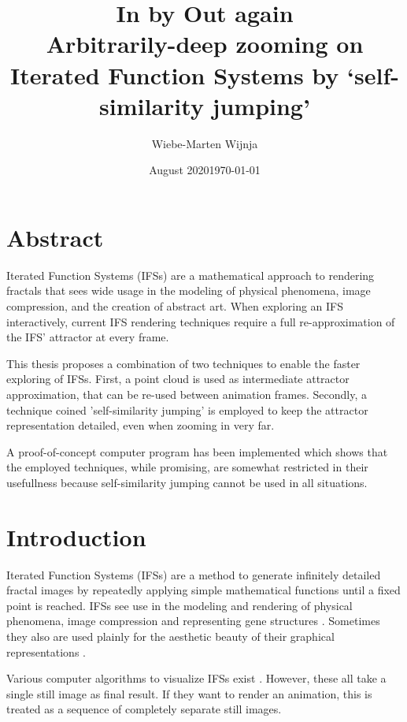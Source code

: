 \documentclass[11pt]{article}
\date{August 2020}
\author{Wiebe-Marten Wijnja}
\date{\today}
\title{\Huge In by Out again\\\medskip
\large Arbitrarily-deep zooming on Iterated Function Systems by `self-similarity jumping'}
\begin{document}
\maketitle
\setcounter{tocdepth}{4}
\tableofcontents



\section{Abstract}
\label{sec:orge12556f}

Iterated Function Systems (IFSs) are a mathematical approach to rendering fractals that sees wide usage in the modeling of physical phenomena, 
image compression, and the creation of abstract art.
When exploring an IFS interactively, current IFS rendering techniques require a full re-approximation of the IFS' attractor at every frame.

This thesis proposes a combination of two techniques to enable the faster exploring of IFSs.
First, a point cloud is used as intermediate attractor approximation, that can be re-used between animation frames.
Secondly, a technique coined 'self-similarity jumping' is employed to keep the attractor representation detailed, even when zooming in very far.

A proof-of-concept computer program has been implemented
which shows that the employed techniques, while promising, 
are somewhat restricted in their usefullness because self-similarity jumping cannot be used in all situations.

\section{Introduction}
\label{sec:orgd2693d1}

Iterated Function Systems (IFSs) are a method to generate infinitely detailed fractal images 
by repeatedly applying simple mathematical functions until a fixed point is reached. \cite{barnsley1988fractals}
IFSs see use in the modeling and rendering of physical phenomena, image compression \cite{hart1996fractal} and representing gene structures \cite{jeffrey1990chaos}.
Sometimes they also are used plainly for the aesthetic beauty of their graphical representations \cite{draves2003fractal}.

Various computer algorithms to visualize IFSs exist \cite{hepting1991rendering}.
However, these all take a single still image as final result. If they want to render an animation,
this is treated as a sequence of completely separate still images.
\end{document}
